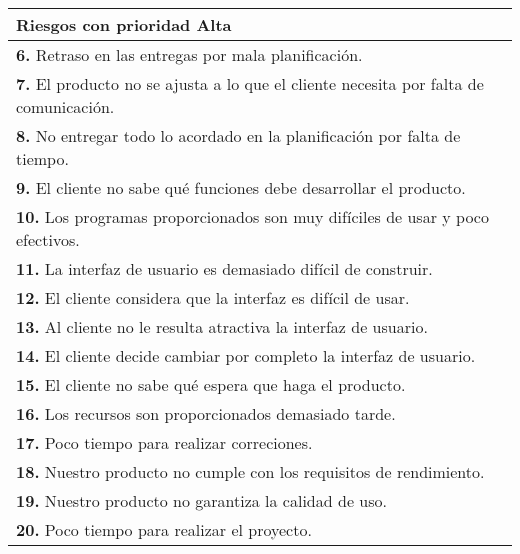 \documentclass[spanish,a4paper,12pt]{report}	%
\begin{document}
			\begin{tabular}{|p{12cm}|}
				\hline
				\textbf{Riesgos con prioridad Alta}\\ \hline \hline
				\textbf{6.} Retraso en las entregas por mala planificación.\\ \hline 
				\textbf{7.} El producto no se ajusta a lo que el cliente necesita por falta de comunicación. \\ \hline
				\textbf{8.}  No entregar todo lo acordado en la planificación por falta de tiempo.\\ \hline
				\textbf{9.} El cliente no sabe qué funciones debe desarrollar el producto. \\ \hline
				\textbf{10.} Los programas proporcionados son muy difíciles de usar y poco efectivos. \\ \hline
				\textbf{11.} La interfaz de usuario es demasiado difícil de construir. \\ \hline
				\textbf{12.} El cliente considera que la interfaz es difícil de usar.		\\ \hline
				\textbf{13.} Al cliente no le resulta atractiva la interfaz de usuario.			\\ \hline
				\textbf{14.} El cliente decide cambiar por completo la interfaz de usuario.			\\ \hline
				\textbf{15.} El cliente no sabe qué espera que haga el producto.			\\ \hline
				\textbf{16. }Los recursos son proporcionados demasiado tarde. 				\\ \hline
				\textbf{17. }Poco tiempo para realizar correciones. \\ \hline
				\textbf{18. }Nuestro producto no cumple con los requisitos de rendimiento. \\ \hline
				\textbf{19. }Nuestro producto no garantiza la calidad de uso. \\ \hline
				\textbf{20. }Poco tiempo para realizar el proyecto. \\ \hline

			\end{tabular}
				\ \\
				\ \\
			
\end{document}

